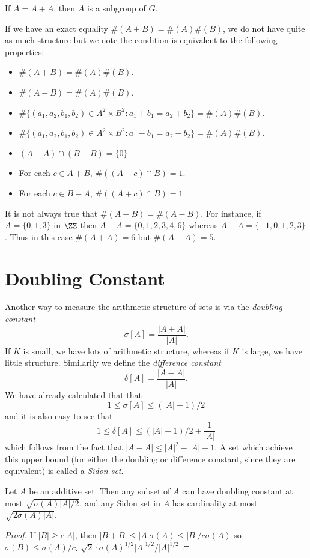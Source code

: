 \begin{corollary}
    If $A = A + A$, then $A$ is a subgroup of $G$.
\end{corollary}

If we have an exact equality $\#(A + B) = \#(A) \#(B)$, we do not have quite as much structure but we note the condition is equivalent to the following properties:
%
\begin{itemize}
    \item $\#(A + B) = \#(A) \#(B)$.
    \item $\#(A - B) = \#(A) \#(B)$.
    \item $\# \{ (a_1,a_2,b_1,b_2) \in A^2 \times B^2 : a_1 + b_1 = a_2 + b_2 \} = \#(A) \#(B)$.
    \item $\# \{ (a_1,a_2,b_1,b_2) \in A^2 \times B^2 : a_1 - b_1 = a_2 - b_2 \} = \#(A) \#(B)$.
    \item $(A - A) \cap (B - B) = \{ 0 \}$.
    \item For each $c \in A + B$, $\#((A - c) \cap B) = 1$.
    \item For each $c \in B - A$, $\#((A + c) \cap B) = 1$.
\end{itemize}

\begin{remark}
    It is not always true that $\#(A + B) = \#(A - B)$. For instance, if $A = \{ 0, 1, 3 \}$ in $\ZZ$ then $A + A = \{ 0,1,2,3,4,6 \}$ whereas $A - A = \{ -1,0,1,2,3 \}$. Thus in this case $\#(A + A) = 6$ but $\#(A - A) = 5$.
\end{remark}

\section{Doubling Constant}

Another way to measure the arithmetic structure of sets is via the \emph{doubling constant}
%
\[ \sigma[A] = \frac{|A + A|}{|A|}. \]
%
If $K$ is small, we have lots of arithmetic structure, whereas if $K$ is large, we have little structure. Similarily we define the \emph{difference constant}
%
\[ \delta[A] = \frac{|A - A|}{|A|}. \]
%
We have already calculated that that
%
\[ 1 \leq \sigma[A] \leq (|A| + 1)/2 \]
%
and it is also easy to see that
%
\[ 1 \leq \delta[A] \leq (|A| - 1)/2 + \frac{1}{|A|} \]
%
which follows from the fact that $|A - A| \leq |A|^2 - |A| + 1$. A set which achieve this upper bound (for either the doubling or difference constant, since they are equivalent) is called a \emph{Sidon set}.

\begin{theorem}
    Let $A$ be an additive set. Then any subset of $A$ can have doubling constant at most $\sqrt{\sigma(A)|A|/2}$, and any Sidon set in $A$ has cardinality at most $\sqrt{2\sigma(A) |A|}$.
\end{theorem}
\begin{proof}
    If $|B| \geq c |A|$, then $|B + B| \leq |A| \sigma(A) \leq |B|/c \sigma(A)$ so $\sigma(B) \leq \sigma(A)/c$. $\sqrt{2} \cdot \sigma(A)^{1/2} |A|^{1/2}/|A|^{1/2}$
\end{proof}

